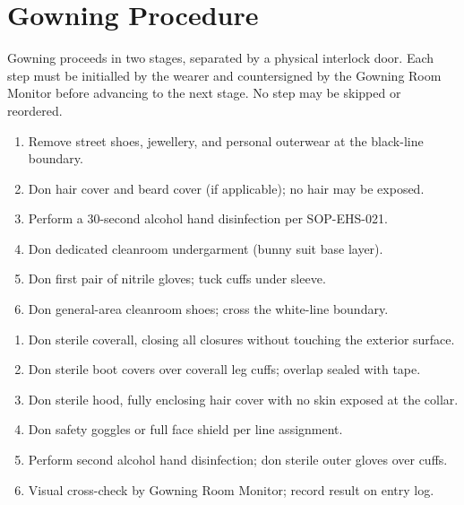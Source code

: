 \section*{Gowning Procedure}

Gowning proceeds in two stages, separated by a physical interlock door. Each step must be
initialled by the wearer and countersigned by the Gowning Room Monitor before advancing to
the next stage. No step may be skipped or reordered.

\begin{minipage}[t]{0.48\linewidth}
\begin{tcolorbox}[colback=panelgray,colframe=ruleline,boxrule=0.6pt,arc=2pt,
  title={\color{white}\bfseries Stage 1 -- Change Room (Black/White)},
  colbacktitle=steelgray,coltitle=white,fonttitle=\small]
\begin{enumerate}[leftmargin=1.4em,itemsep=3pt,label=\gcheck~\arabic*.]
  \item Remove street shoes, jewellery, and personal outerwear at the black-line boundary.
  \item Don hair cover and beard cover (if applicable); no hair may be exposed.
  \item Perform a 30-second alcohol hand disinfection per SOP-EHS-021.
  \item Don dedicated cleanroom undergarment (bunny suit base layer).
  \item Don first pair of nitrile gloves; tuck cuffs under sleeve.
  \item Don general-area cleanroom shoes; cross the white-line boundary.
\end{enumerate}
\end{tcolorbox}
\end{minipage}%
\hfill
\begin{minipage}[t]{0.48\linewidth}
\begin{tcolorbox}[colback=panelgray,colframe=ruleline,boxrule=0.6pt,arc=2pt,
  title={\color{white}\bfseries Stage 2 -- Gowning Room (White/White)},
  colbacktitle=cleanblue,coltitle=white,fonttitle=\small]
\begin{enumerate}[leftmargin=1.4em,itemsep=3pt,label=\gcheck~\arabic*.]
  \item Don sterile coverall, closing all closures without touching the exterior surface.
  \item Don sterile boot covers over coverall leg cuffs; overlap sealed with tape.
  \item Don sterile hood, fully enclosing hair cover with no skin exposed at the collar.
  \item Don safety goggles or full face shield per line assignment.
  \item Perform second alcohol hand disinfection; don sterile outer gloves over cuffs.
  \item Visual cross-check by Gowning Room Monitor; record result on entry log.
\end{enumerate}
\end{tcolorbox}
\end{minipage}
\par

